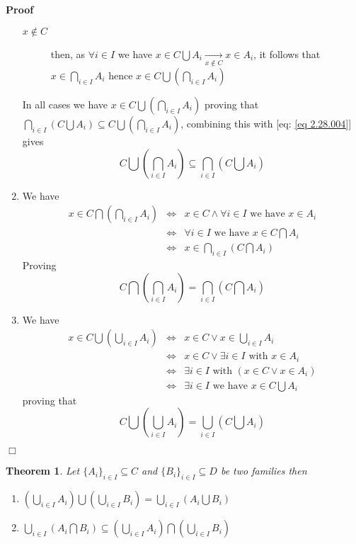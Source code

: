 \documentclass{book}
\newcommand{\Rightarrowlim}{\mathop{\rightarrow}\limits}
\newcommand{\nin}{\not\in}
\newenvironment{proof}{\noindent\textbf{Proof\ }}{\hspace*{\fill}$\Box$\medskip}
\newtheorem{theorem}{Theorem}
\begin{document}
\begin{proof}
\begin{enumerate}
\begin{description}
      \item[$x \nin C$] then, as $\forall i \in I$ we have $x \in C \bigcup
      A_i \Rightarrowlim_{x \nin C} x \in A_i$, it follows that $x \in
      \bigcap_{i \in I} A_i$ hence $x \in C \bigcup \left( \bigcap_{i \in I}
      A_i \right)$
    \end{description}
    In all cases we have $x \in C \bigcup \left( \bigcap_{i \in I} A_i
    \right)$ proving that $\bigcap_{i \in I} \left( C \bigcup A_i \right)
    \subseteq C \bigcup \left( \bigcap_{i \in I} A_i \right)$, combining this
    with [eq: \ref{eq 2.28.004}] gives
    \[ C \bigcup \left( \bigcap_{i \in I} A_i \right) \subseteq \bigcap_{i
       \in I} \left( C \bigcup A_i \right) \]
    \item We have
    \begin{eqnarray*}
      x \in C \bigcap \left( \bigcap_{i \in I} A_i \right) & \Leftrightarrow &
      x \in C \wedge \forall i \in I \text{ we have } x \in A_i\\
      & \Leftrightarrow & \forall i \in I \text{ we have } x \in C \bigcap
      A_i\\
      & \Leftrightarrow & x \in \bigcap_{i \in I} \left( C \bigcap A_i
      \right)
    \end{eqnarray*}
    Proving
    \[ C \bigcap \left( \bigcap_{i \in I} A_i \right) = \bigcap_{i \in I}
       \left( C \bigcap A_i \right) \]
    \item We have
    \begin{eqnarray*}
      x \in C \bigcup \left( \bigcup_{i \in I} A_i \right) & \Leftrightarrow &
      x \in C \vee x \in \bigcup_{i \in I} A_i\\
      & \Leftrightarrow & x \in C \vee \exists i \in I \text{ with } x \in
      A_i\\
      & \Leftrightarrow & \exists i \in I \text{ with } (x \in C \vee x \in
      A_i)\\
      & \Leftrightarrow & \exists i \in I \text{ we have } x \in C \bigcup
      A_i
    \end{eqnarray*}
    proving that
    \[ C \bigcup \left( \bigcup_{i \in I} A_i \right) = \bigcup_{i \in I}
       \left( C \bigcup A_i \right) \]
  \end{enumerate}
  
\end{proof}

\begin{theorem}
  \label{family union of union of two families}Let $\{ A_i \}_{i \in I}
  \subseteq C$ and $\{ B_i \}_{i \in I} \subseteq D$ be two families then
  \begin{enumerate}
    \item $\left( \bigcup_{i \in I} A_i \right) \bigcup \left( \bigcup_{i \in
    I} B_i \right) = \bigcup_{i \in I} \left( A_i \bigcup B_i \right)$
    
    \item $\bigcup_{i \in I} \left( A_i \bigcap B_i \right) \subseteq \left(
    \bigcup_{i \in I} A_i \right) \bigcap \left( \bigcup_{i \in I} B_i
    \right)$
  \end{enumerate}
\end{theorem}
\end{document}

